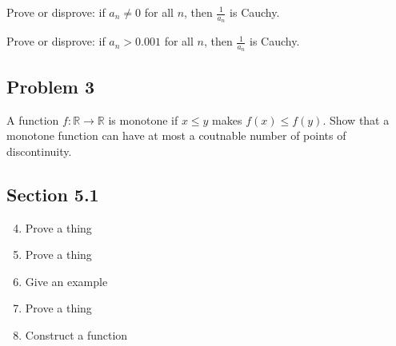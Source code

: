 \documentclass[11pt]{article}
\newcommand{\R}{\mathbb{R}}
\begin{document}
Prove or disprove: if $a_n\neq0$ for all $n$, then $\frac{1}{a_n}$ is Cauchy.

Prove or disprove: if $a_n>0.001$ for all $n$, then $\frac{1}{a_n}$ is Cauchy.

\subsection*{Problem 3}

A function $f:\R\to\R$ is monotone if $x\leq y$ makes $f(x)\leq f(y)$.
Show that a monotone function can have at most a coutnable number of
points of discontinuity.

\subsection*{Section 5.1}

\begin{enumerate}
\setcounter{enumi}{3}

\item{Prove a thing}

\item{Prove a thing}

\item{Give an example}

\item{Prove a thing}

\item{Construct a function}

\end{enumerate}
\end{document}
